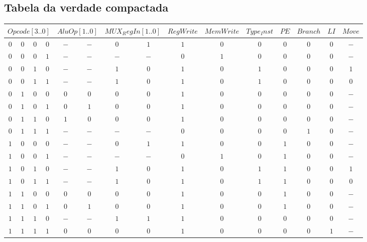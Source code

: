 \documentclass [15pt,a4paper,twoside]{article}
\begin{document}
\subsection{Tabela da verdade compactada}
\begin{center}
\begin{tabular}{cccc|ccccccccccc}
\multicolumn{4}{c|}{$Opcode[3..0]$}&\multicolumn{2}{c}{$AluOp[1..0]$}&\multicolumn{2}{c}{$MUX_RegIn[1..0]$}&$RegWrite$&$MemWrite$&$Type_Inst$&$PE$&$Branch$&$LI$&$Move$\\
\hline
$0$&$0$&$0$&$0$&$-$&$-$&$0$&$1$&$1$&$0$&$0$&$0$&$0$&$0$&$-$\\
$0$&$0$&$0$&$1$&$-$&$-$&$-$&$-$&$0$&$1$&$0$&$0$&$0$&$0$&$-$\\
$0$&$0$&$1$&$0$&$-$&$-$&$1$&$0$&$1$&$0$&$1$&$0$&$0$&$0$&$1$\\
$0$&$0$&$1$&$1$&$-$&$-$&$1$&$0$&$1$&$0$&$1$&$0$&$0$&$0$&$0$\\
$0$&$1$&$0$&$0$&$0$&$0$&$0$&$0$&$1$&$0$&$0$&$0$&$0$&$0$&$-$\\
$0$&$1$&$0$&$1$&$0$&$1$&$0$&$0$&$1$&$0$&$0$&$0$&$0$&$0$&$-$\\
$0$&$1$&$1$&$0$&$1$&$0$&$0$&$0$&$1$&$0$&$0$&$0$&$0$&$0$&$-$\\
$0$&$1$&$1$&$1$&$-$&$-$&$-$&$-$&$0$&$0$&$0$&$0$&$1$&$0$&$-$\\
$1$&$0$&$0$&$0$&$-$&$-$&$0$&$1$&$1$&$0$&$0$&$1$&$0$&$0$&$-$\\
$1$&$0$&$0$&$1$&$-$&$-$&$-$&$-$&$0$&$1$&$0$&$1$&$0$&$0$&$-$\\
$1$&$0$&$1$&$0$&$-$&$-$&$1$&$0$&$1$&$0$&$1$&$1$&$0$&$0$&$1$\\
$1$&$0$&$1$&$1$&$-$&$-$&$1$&$0$&$1$&$0$&$1$&$1$&$0$&$0$&$0$\\
$1$&$1$&$0$&$0$&$0$&$0$&$0$&$0$&$1$&$0$&$0$&$1$&$0$&$0$&$-$\\
$1$&$1$&$0$&$1$&$0$&$1$&$0$&$0$&$1$&$0$&$0$&$1$&$0$&$0$&$-$\\
$1$&$1$&$1$&$0$&$-$&$-$&$1$&$1$&$1$&$0$&$0$&$0$&$0$&$0$&$-$\\
$1$&$1$&$1$&$1$&$0$&$0$&$0$&$0$&$1$&$0$&$0$&$0$&$0$&$1$&$-$\\

\end{tabular}
\end{center}
\end{document}

